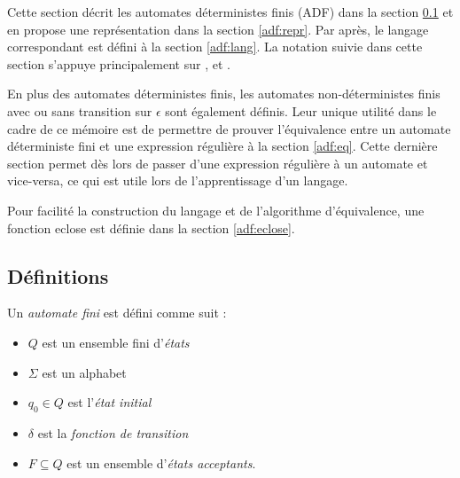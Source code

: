 Cette section décrit les automates déterministes finis (ADF) dans la section \ref{adf:def} et en propose une représentation dans la section \ref{adf:repr}. Par après, le langage correspondant est défini à la section \ref{adf:lang}.  La notation suivie dans cette section s'appuye principalement sur \cite{Hopcroft79}, \cite{Hopcroft00} et \cite{Kozen97}.

En plus des automates déterministes finis, les automates non-déterministes finis avec ou sans transition sur $\epsilon$ sont également définis. Leur unique utilité dans le cadre de ce mémoire est de permettre de prouver l'équivalence entre un automate déterministe fini et une expression régulière à la section \ref{adf:eq}. Cette dernière section permet dès lors de passer d'une expression régulière à un automate et vice-versa, ce qui est utile lors de l'apprentissage d'un langage.

Pour facilité la construction du langage et de l'algorithme d'équivalence, une fonction eclose est définie dans la section \ref{adf:eclose}.



\subsection{Définitions}\label{adf:def}

Un \emph{automate fini} \automaton est défini comme suit :
\begin{itemize}
  \item $Q$ est un ensemble fini d'\emph{états}
  \item $\Sigma$ est un alphabet
  \item $q_0 \in Q$ est l'\emph{état initial}
  \item $\delta$ est la \emph{fonction de transition}
  \item $F \subseteq Q$ est un ensemble d'\emph{états acceptants}.
\end{itemize}

